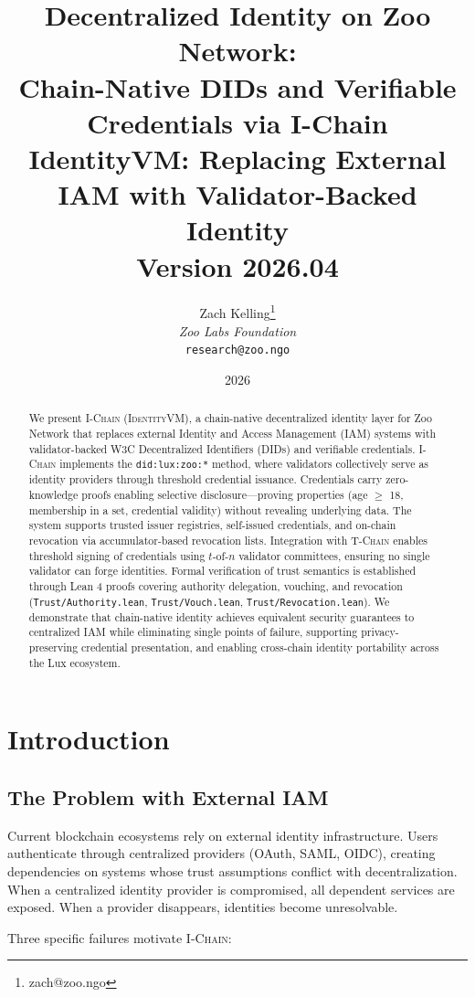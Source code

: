 \documentclass[11pt,letterpaper]{article}
\title{\textbf{Decentralized Identity on Zoo Network:\\Chain-Native DIDs and Verifiable Credentials via I-Chain}\\
\large IdentityVM: Replacing External IAM with Validator-Backed Identity\\
\vspace{5pt}
\normalsize Version 2026.04}
\author{
Zach Kelling\thanks{zach@zoo.ngo}\\
\textit{Zoo Labs Foundation}\\
\texttt{research@zoo.ngo}
}
\date{2026}
\theoremstyle{definition}
\theoremstyle{remark}
\newcommand{\IChain}{\textsc{I-Chain}}
\newcommand{\TChain}{\textsc{T-Chain}}
\newcommand{\IdentityVM}{\textsc{IdentityVM}}
\begin{document}
\zoocoverpage

\begin{abstract}
We present \IChain{} (\IdentityVM{}), a chain-native decentralized identity layer for Zoo Network that replaces external Identity and Access Management (IAM) systems with validator-backed W3C Decentralized Identifiers (DIDs) and verifiable credentials. \IChain{} implements the \texttt{did:lux:zoo:*} method, where validators collectively serve as identity providers through threshold credential issuance. Credentials carry zero-knowledge proofs enabling selective disclosure---proving properties (age $\geq$ 18, membership in a set, credential validity) without revealing underlying data. The system supports trusted issuer registries, self-issued credentials, and on-chain revocation via accumulator-based revocation lists. Integration with \TChain{} enables threshold signing of credentials using $t$-of-$n$ validator committees, ensuring no single validator can forge identities. Formal verification of trust semantics is established through Lean 4 proofs covering authority delegation, vouching, and revocation (\texttt{Trust/Authority.lean}, \texttt{Trust/Vouch.lean}, \texttt{Trust/Revocation.lean}). We demonstrate that chain-native identity achieves equivalent security guarantees to centralized IAM while eliminating single points of failure, supporting privacy-preserving credential presentation, and enabling cross-chain identity portability across the Lux ecosystem.
\end{abstract}

\tableofcontents
\newpage

\section{Introduction}

\subsection{The Problem with External IAM}

Current blockchain ecosystems rely on external identity infrastructure. Users authenticate through centralized providers (OAuth, SAML, OIDC), creating dependencies on systems whose trust assumptions conflict with decentralization. When a centralized identity provider is compromised, all dependent services are exposed. When a provider disappears, identities become unresolvable.

Three specific failures motivate \IChain{}:
\end{document}
